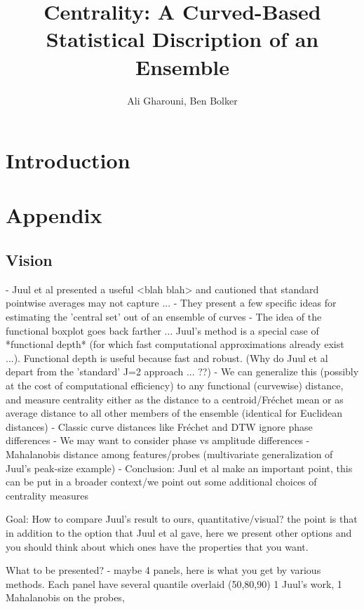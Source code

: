 \documentclass[12pt]{article}
\title{Centrality: A Curved-Based Statistical Discription of an Ensemble}
\author{Ali Gharouni, Ben Bolker}
\theoremstyle{definition} %
\begin{document}
\maketitle
\linenumbers

\section{Introduction}




\section{Appendix}

\subsection{Vision}

- Juul et al presented a useful <blah blah> and cautioned that standard pointwise averages may not capture ...
- They present a few specific ideas for estimating the 'central set' out of an ensemble of curves
- The idea of the functional boxplot goes back farther ... Juul's method is a special case of *functional depth* (for which fast computational approximations already exist ...). Functional depth is useful because fast and robust. (Why do Juul et al depart from the 'standard' J=2 approach ... ??)
- We can generalize this (possibly at the cost of computational efficiency) to any functional (curvewise) distance, and measure centrality either as the distance to a centroid/Fréchet mean or as average distance to all other members of the ensemble (identical for Euclidean distances)
   - Classic curve distances like Fréchet and DTW ignore phase differences
   - We may want to consider phase vs amplitude differences
   - Mahalanobis distance among features/probes (multivariate generalization of Juul's peak-size example)
- Conclusion: Juul et al make an important point, this can be put in a broader context/we point out some additional choices of centrality measures
   
Goal: 
 How to compare Juul's result to ours, quantitative/visual? the point is that in addition to the option that Juul et al gave, here we present other options and you should think about which ones have the properties that you want.
 
What to be presented? 
- maybe 4 panels, here is what you get by various methods. Each panel have several quantile overlaid (50,80,90) 1 Juul's work, 1 Mahalanobis on the probes,  
\end{document}
